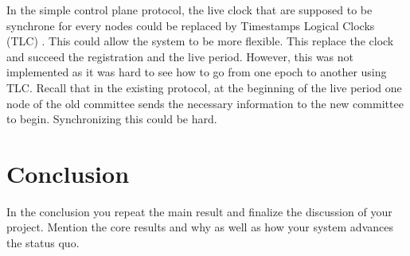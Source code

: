 \documentclass[a4paper,11pt,oneside]{report}
\begin{document}
In the simple control plane protocol, the live clock that are supposed to be
synchrone for every nodes could be replaced by Timestamps Logical Clocks (TLC)
\cite{Que-Sera-Consensus}. This could allow the system to be more flexible.
This replace the clock and succeed the registration and the live period.
However, this was not implemented as it was hard to see how to go from one
epoch to another using TLC. Recall that in the existing protocol, at the
beginning of the live period one node of the old committee sends the necessary
information to the new committee to begin. Synchronizing this could be hard.



\chapter{Conclusion}

In the conclusion you repeat the main result and finalize the discussion of
your project. Mention the core results and why as well as how your system
advances the status quo.

\cleardoublepage {} {}
\printbibliography

%
%
\end{document}
